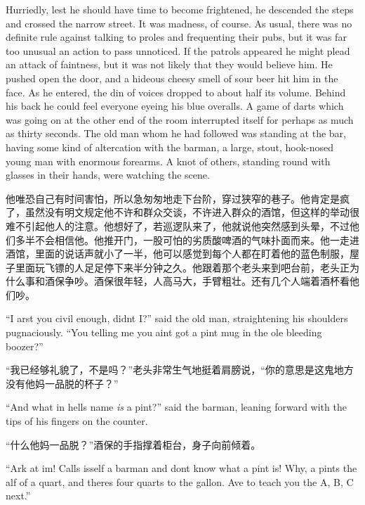 \begin{paracol}{2}
Hurriedly, lest he should have time to become frightened, he descended
the steps and crossed the narrow street. It was madness, of course. As
usual, there was no definite rule against talking to proles and
frequenting their pubs, but it was far too unusual an action to pass
unnoticed. If the patrols appeared he might plead an attack of
faintness, but it was not likely that they would believe him. He pushed
open the door, and a hideous cheesy smell of sour beer hit him in the
face. As he entered, the din of voices dropped to about half its volume.
Behind his back he could feel everyone eyeing his blue overalls. A game
of darts which was going on at the other end of the room interrupted
itself for perhaps as much as thirty seconds. The old man whom he had
followed was standing at the bar, having some kind of altercation with
the barman, a large, stout, hook-nosed young man with enormous forearms.
A knot of others, standing round with glasses in their hands, were
watching the scene.

\switchcolumn

他唯恐自己有时间害怕，所以急匆匆地走下台阶，穿过狭窄的巷子。他肯定是疯了，虽然没有明文规定他不许和群众交谈，不许进入群众的酒馆，但这样的举动很难不引起他人的注意。他想好了，若巡逻队来了，他就说他突然感到头晕，不过他们多半不会相信他。他推开门，一股可怕的劣质酸啤酒的气味扑面而来。他一走进酒馆，里面的说话声就小了一半，他可以感觉到每个人都在盯着他的蓝色制服，屋子里面玩飞镖的人足足停下来半分钟之久。他跟着那个老头来到吧台前，老头正为什么事和酒保争吵。酒保很年轻，人高马大，手臂粗壮。还有几个人端着酒杯看他们吵。

\switchcolumn*

``I arst you civil enough, didn\textquotesingle t I?'' said the old man,
straightening his shoulders pugnaciously. ``You telling me you
ain\textquotesingle t got a pint mug in the \textquotesingle ole
bleeding boozer?''

\switchcolumn

``我已经够礼貌了，不是吗？''老头非常生气地挺着肩膀说，``你的意思是这鬼地方没有他妈一品脱的杯子？''

\switchcolumn*

``And what in hell\textquotesingle s name \emph{is} a pint?'' said the
barman, leaning forward with the tips of his fingers on the counter.

\switchcolumn

``什么他妈一品脱？''酒保的手指撑着柜台，身子向前倾着。

\switchcolumn*

``\textquotesingle Ark at \textquotesingle im! Calls
\textquotesingle isself a barman and don\textquotesingle t know what a
pint is! Why, a pint\textquotesingle s the \textquotesingle alf of a
quart, and there\textquotesingle s four quarts to the gallon.
\textquotesingle Ave to teach you the A, B, C next.''


\end{paracol}
